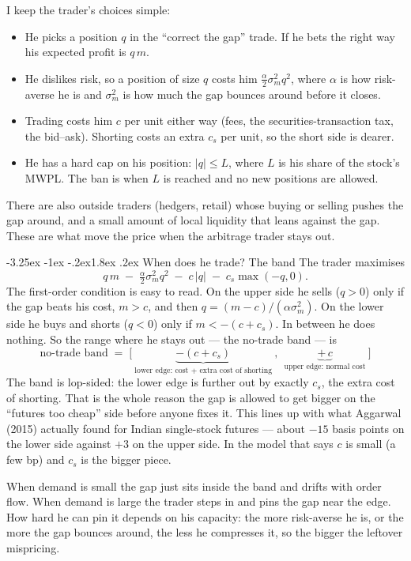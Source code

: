 \documentclass[11pt]{article}
\makeatletter
\renewcommand\section{\@startsection{section}{1}{\z@}%
  {-3.25ex \@plus -1ex \@minus -.2ex}{1.8ex \@plus.2ex}%
  {\normalfont\large\bfseries\color{owblue}}}
\makeatother
\begin{document}
I keep the trader's choices simple:
\begin{itemize}
\item He picks a position $q$ in the ``correct the gap'' trade. If he bets the right way his expected profit is $q\,m$.
\item He dislikes risk, so a position of size $q$ costs him $\tfrac{\alpha}{2}\sigma_m^2 q^2$, where $\alpha$ is how risk-averse he is and $\sigma_m^2$ is how much the gap bounces around before it closes.
\item Trading costs him $c$ per unit either way (fees, the securities-transaction tax, the bid--ask). Shorting costs an extra $c_s$ per unit, so the short side is dearer.
\item He has a hard cap on his position: $|q|\le L$, where $L$ is his share of the stock's MWPL. The ban is when $L$ is reached and no new positions are allowed.
\end{itemize}
There are also outside traders (hedgers, retail) whose buying or selling pushes the gap around, and a small amount of local liquidity that leans against the gap. These are what move the price when the arbitrage trader stays out.

\section{When does he trade? The band}
The trader maximises
\[
q\,m \;-\; \tfrac{\alpha}{2}\sigma_m^2 q^2 \;-\; c\,|q| \;-\; c_s\max(-q,0).
\]
The first-order condition is easy to read. On the upper side he sells ($q>0$) only if the gap beats his cost, $m>c$, and then $q=(m-c)/(\alpha\sigma_m^2)$. On the lower side he buys and shorts ($q<0$) only if $m<-(c+c_s)$. In between he does nothing. So the range where he stays out --- the no-trade band --- is
\[
\boxed{\;\text{no-trade band}\;=\;\Big[\ \underbrace{-(c+c_s)}_{\text{lower edge: cost }+\text{ extra cost of shorting}}\ ,\ \ \underbrace{+\,c}_{\text{upper edge: normal cost}}\ \Big]\;}
\]
The band is lop-sided: the lower edge is further out by exactly $c_s$, the extra cost of shorting. That is the whole reason the gap is allowed to get bigger on the ``futures too cheap'' side before anyone fixes it. This lines up with what Aggarwal (2015) actually found for Indian single-stock futures --- about $-15$ basis points on the lower side against $+3$ on the upper side. In the model that says $c$ is small (a few bp) and $c_s$ is the bigger piece.

When demand is small the gap just sits inside the band and drifts with order flow. When demand is large the trader steps in and pins the gap near the edge. How hard he can pin it depends on his capacity: the more risk-averse he is, or the more the gap bounces around, the less he compresses it, so the bigger the leftover mispricing.
\end{document}
